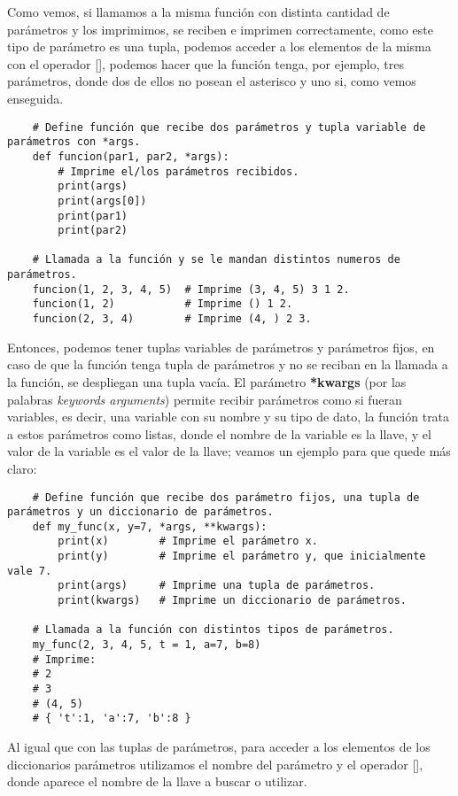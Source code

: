 Como vemos, si llamamos a la misma función con distinta cantidad de parámetros y los imprimimos, se reciben e imprimen correctamente, como este tipo de parámetro es una tupla, podemos acceder a los elementos de la misma con el operador [], podemos hacer que la función tenga, por ejemplo, tres parámetros, donde dos de ellos no posean el asterisco y uno si, como vemos enseguida.
\begin{lstlisting}
    # Define función que recibe dos parámetros y tupla variable de parámetros con *args.
    def funcion(par1, par2, *args):
        # Imprime el/los parámetros recibidos.
        print(args)
        print(args[0])
        print(par1)
        print(par2)

    # Llamada a la función y se le mandan distintos numeros de parámetros.   
    funcion(1, 2, 3, 4, 5)  # Imprime (3, 4, 5) 3 1 2.
    funcion(1, 2)			# Imprime () 1 2.
    funcion(2, 3, 4)		# Imprime (4, ) 2 3.
\end{lstlisting}

Entonces, podemos tener tuplas variables de parámetros y parámetros fijos, en caso de que la función tenga tupla de parámetros y no se reciban en la llamada a la función, se despliegan una tupla vacía. El parámetro \textbf{*kwargs} (por las palabras \textit{keywords arguments}) permite recibir parámetros como si fueran variables, es decir, una variable con su nombre y su tipo de dato, la función trata a estos parámetros como listas, donde el nombre de la variable es la llave, y el valor de la variable es el valor de la llave; veamos un ejemplo para que quede más claro:
\begin{lstlisting}
    # Define función que recibe dos parámetro fijos, una tupla de parámetros y un diccionario de parámetros.
    def my_func(x, y=7, *args, **kwargs):
        print(x)		# Imprime el parámetro x.
        print(y)		# Imprime el parámetro y, que inicialmente vale 7.
        print(args)     # Imprime una tupla de parámetros.
        print(kwargs)	# Imprime un diccionario de parámetros.

    # Llamada a la función con distintos tipos de parámetros.
    my_func(2, 3, 4, 5, t = 1, a=7, b=8)
    # Imprime:
    # 2
    # 3
    # (4, 5)
    # { 't':1, 'a':7, 'b':8 }
\end{lstlisting}

Al igual que con las tuplas de parámetros, para acceder a los elementos de los diccionarios parámetros utilizamos el nombre del parámetro y el operador [], donde aparece el nombre de la llave a buscar o utilizar.


